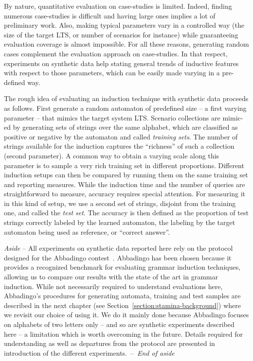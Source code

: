 By nature, quantitative evaluation on case-studies is limited. Indeed, finding numerous case-studies is difficult and having large ones implies a lot of preliminary work. Also, making typical parameters vary in a controlled way (the size of the target LTS, or number of scenarios for instance) while guaranteeing evaluation coverage is almost impossible. For all these reasons, generating random cases complement the evaluation approach on case-studies. In that respect, experiments on synthetic data help stating general trends of inductive features with respect to those parameters, which can be easily made varying in a pre-defined way.

The rough idea of evaluating an induction technique with synthetic data proceeds as follows. First generate a random automaton of predefined size -- a first varying parameter -- that mimics the target system LTS. Scenario collections are mimic-ed by generating sets of strings over the same alphabet, which are classified as positive or negative by the automaton and called \emph{training sets}. The number of strings available for the induction captures the ``richness'' of such a collection (second parameter). A common way to obtain a varying scale along this parameter is to sample a very rich training set in different proportions. Different induction setups can then be compared by running them on the same training set and reporting measures. While the induction time and the number of queries are straightforward to measure, accuracy requires special attention. For measuring it in this kind of setup, we use a second set of strings, disjoint from the training one, and called the \emph{test set}. The accuracy is then defined as the proportion of test strings correctly labeled by the learned automaton, the labeling by the target automaton being used as reference, or ``correct answer''. 

\emph{Aside} -- All experiments on synthetic data reported here rely on the protocol designed for the Abbadingo contest~\cite{Lang:1998}. Abbadingo has been chosen because it provides a recognized benchmark for evaluating grammar induction techniques, allowing us to compare our results with the state of the art in grammar induction. While not necessarily required to understand evaluations here, Abbadingo's procedures for generating automata, training and test samples are described in the next chapter (see Section~\ref{section:stamina-background}) where we revisit our choice of using it. We do it mainly done because Abbadingo focuses on alphabets of two letters only -- and so are synthetic experiments described here -- a limitation which is worth overcoming in the future. Details required for understanding as well as departures from the protocol are presented in introduction of the different experiments.~--~\emph{End of aside}

